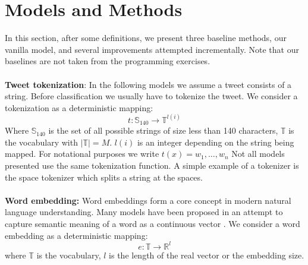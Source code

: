 \documentclass[conference]{IEEEtran}
\begin{document}
\section{Models and Methods}
\label{sec:models}
In this section, after some definitions, we present three baseline methods, our vanilla model, and several improvements attempted incrementally. Note that our baselines are not taken from the programming exercises.\\\\
\textbf{Tweet tokenization}: In the following models we assume a tweet consists of a string. Before classification we usually have to tokenize the tweet. We consider a tokenization as a deterministic mapping:
	\begin{equation}
	t:\mathbb{S}_{140} \rightarrow \mathbb{T}^{l(i)}
	\end{equation} Where $\mathbb{S}_{140}$ is the set of all possible strings of size less than 140 characters, $\mathbb{T}$ is the vocabulary with $|\mathbb{T}|=M$. $l(i)$ is an integer depending on the string being mapped. For notational purposes we write $t(x) = w_1,\dots,w_n$ Not all models presented use the same tokenization function. A simple example of a tokenizer is the space tokenizer which splits a string at the spaces.\\\\
\textbf{Word embedding:}
Word embeddings form a core concept in modern natural language understanding. Many models have been proposed in an attempt to capture semantic meaning of a word as a continuous vector \cite{Survey, Word2vec, GLOVE}. We consider a word embedding as a deterministic mapping:
	\begin{equation}
	e:\mathbb{T} \rightarrow \mathbb{R}^l
	\end{equation} where $\mathbb{T}$ is the vocabulary, $l$ is the length of the real vector or the embedding size.
	
\end{document}
